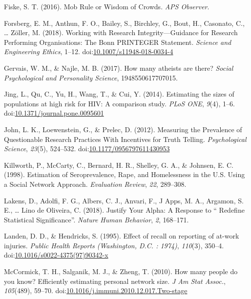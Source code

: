 \documentclass[jou]{apa6}
\theoremstyle{definition}
\theoremstyle{definition}
\theoremstyle{definition}
\theoremstyle{remark}
\begin{document}
\hypertarget{ref-Fiske2016}{}
Fiske, S. T. (2016). Mob Rule or Wisdom of Crowds. \emph{APS Observer}.

\hypertarget{ref-Forsberg2018}{}
Forsberg, E. M., Anthun, F. O., Bailey, S., Birchley, G., Bout, H.,
Casonato, C., \ldots{} Zöller, M. (2018). Working with Research
Integrity---Guidance for Research Performing Organisations: The Bonn
PRINTEGER Statement. \emph{Science and Engineering Ethics}, 1--12.
doi:\href{https://doi.org/10.1007/s11948-018-0034-4}{10.1007/s11948-018-0034-4}

\hypertarget{ref-Gervais2017}{}
Gervais, W. M., \& Najle, M. B. (2017). How many atheists are there?
\emph{Social Psychological and Personality Science}, 1948550617707015.

\hypertarget{ref-Jing2014}{}
Jing, L., Qu, C., Yu, H., Wang, T., \& Cui, Y. (2014). Estimating the
sizes of populations at high risk for HIV: A comparison study.
\emph{PLoS ONE}, \emph{9}(4), 1--6.
doi:\href{https://doi.org/10.1371/journal.pone.0095601}{10.1371/journal.pone.0095601}

\hypertarget{ref-John2012}{}
John, L. K., Loewenstein, G., \& Prelec, D. (2012). Measuring the
Prevalence of Questionable Research Practices With Incentives for Truth
Telling. \emph{Psychological Science}, \emph{23}(5), 524--532.
doi:\href{https://doi.org/10.1177/0956797611430953}{10.1177/0956797611430953}

\hypertarget{ref-Killworth1998a}{}
Killworth, P., McCarty, C., Bernard, H. R., Shelley, G. A., \& Johnsen,
E. C. (1998). Estimation of Seroprevalence, Rape, and Homelessness in
the U.S. Using a Social Network Approach. \emph{Evaluation Review},
\emph{22}, 289--308.

\hypertarget{ref-Lakensabc1860}{}
Lakens, D., Adolfi, F. G., Albers, C. J., Anvari, F., J Apps, M. A.,
Argamon, S. E., \ldots{} Lino de Oliveira, C. (2018). Justify Your
Alpha: A Response to `` Redefine Statistical Significance''.
\emph{Nature Human Behavior}, \emph{2}, 168--171.

\hypertarget{ref-Landen1995}{}
Landen, D. D., \& Hendricks, S. (1995). Effect of recall on reporting of
at-work injuries. \emph{Public Health Reports (Washington, D.C. :
1974)}, \emph{110}(3), 350--4.
doi:\href{https://doi.org/10.1016/s0022-4375(97)90342-x}{10.1016/s0022-4375(97)90342-x}

\hypertarget{ref-McCormick2010}{}
McCormick, T. H., Salganik, M. J., \& Zheng, T. (2010). How many people
do you know? Efficiently estimating personal network size. \emph{J Am
Stat Assoc.}, \emph{105}(489), 59--70.
doi:\href{https://doi.org/10.1016/j.immuni.2010.12.017.Two-stage}{10.1016/j.immuni.2010.12.017.Two-stage}
\end{document}
